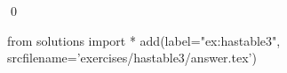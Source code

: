 
\begin{ex} 
  \label{ex:hastable3}
  
  \qed
\end{ex} 
\begin{python0}
from solutions import *
add(label="ex:hastable3",
    srcfilename='exercises/hastable3/answer.tex') 
\end{python0}
